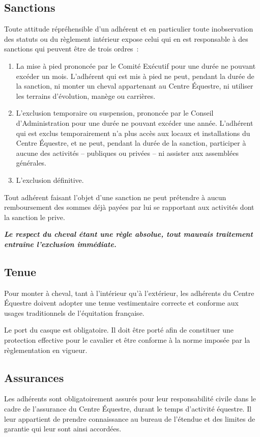 \documentclass[11pt,a4paper]{article}
\begin{document}
\subsection{Sanctions}
Toute attitude répréhensible d'un adhérent et en particulier toute inobservation des statuts ou du règlement intérieur expose celui qui en est responsable à des sanctions qui peuvent être de trois ordres~:
\begin{enumerate}
\item
La mise à pied prononcée par le Comité Exécutif pour une durée ne pouvant excéder un mois.
L'adhérent qui est mis à pied ne peut, pendant la durée de la sanction, ni monter un cheval appartenant au Centre Équestre, ni utiliser les terrains d'évolution, manège ou carrières.
\item
L'exclusion temporaire ou suspension, prononcée par le Conseil d'Administration pour une durée ne pouvant excéder une année.
L'adhérent qui est exclus temporairement n'a plus accès aux locaux et installations du Centre Équestre, et ne peut, pendant la durée de la sanction, participer à aucune des activités -- publiques ou privées -- ni assister aux assemblées générales.
\item
L'exclusion définitive.
\end{enumerate}
Tout adhérent faisant l'objet d'une sanction ne peut prétendre à aucun remboursement des sommes déjà payées par lui se rapportant aux activités dont la sanction le prive.

\textit{\textbf{Le respect du cheval étant une règle absolue, tout mauvais traitement entraîne l'exclusion immédiate.}}

\subsection{Tenue}
Pour monter à cheval, tant à l'intérieur qu'à l'extérieur, les adhérents du Centre Équestre doivent adopter une tenue vestimentaire correcte et conforme aux usages traditionnels de l'équitation française.

Le port du casque est obligatoire.
Il doit être porté afin de constituer une protection effective pour le cavalier et être conforme à la norme imposée par la règlementation en vigueur.

\subsection{Assurances}
Les adhérents sont obligatoirement assurés pour leur responsabilité civile dans le cadre de l'assurance du Centre Équestre, durant le temps d'activité équestre.
Il leur appartient de prendre connaissance au bureau de l'étendue et des limites de garantie qui leur sont ainsi accordées.
\end{document}

